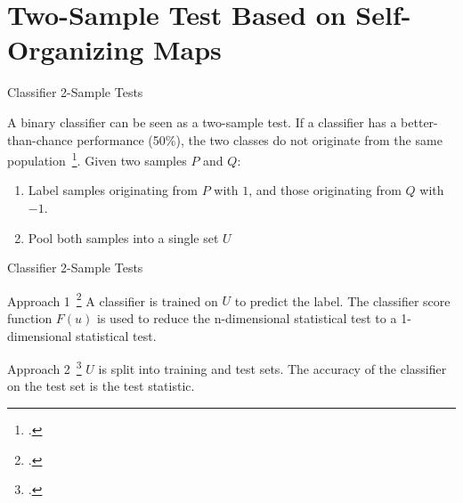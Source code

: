 \documentclass[10pt]{beamer}
\begin{document}
\section{Two-Sample Test Based on Self-Organizing Maps}


\begin{frame}{Classifier 2-Sample Tests}
    \begin{block}{}
        A binary classifier can be seen as a two-sample test.
        If a classifier has a better-than-chance performance (50\%), the two classes do not originate from the same
        population~\footcite{friedman2004multivariate}.
        \smallskip
        Given two samples $P$ and $Q$:
        \begin{enumerate}
            \item Label samples originating from $P$ with $1$, and those originating from $Q$ with $-1$.
            \item Pool both samples into a single set $U$
        \end{enumerate}
    \end{block}
\end{frame}

\begin{frame}{Classifier 2-Sample Tests}
    \begin{block}{Approach 1~\footcite{friedman2004multivariate}}
        A classifier is trained on $U$ to predict the label. The classifier score function $F(u)$ is used
        to reduce the n-dimensional statistical test to a 1-dimensional statistical test.
    \end{block}
    \begin{block}{Approach 2~\footcite{lopez2016revisiting}}
        $U$ is split into training and test sets. The accuracy of the classifier on the test set is the test statistic.
    \end{block}

\end{frame}
\end{document}
